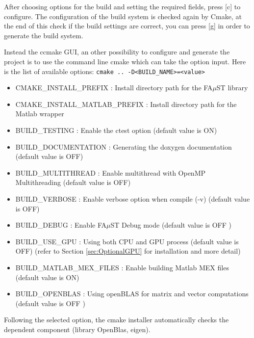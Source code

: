 After choosing options for the build and setting the required fields, press [c] to configure. The configuration of the build system is checked again by Cmake, at the end of this check if the build settings are correct, you can press [g] in order to generate the build system.

Instead the ccmake GUI, an other possibility to configure and generate the project is to use the command line cmake which can take the option input. Here is the list of available options: 
\texttt{cmake\ ..\ -D<BUILD\_NAME>=<value>}

\begin{itemize}
\item CMAKE\_INSTALL\_PREFIX : Install directory path for the FA$\mu$ST library
\item CMAKE\_INSTALL\_MATLAB\_PREFIX : Install directory path for the Matlab wrapper
\item BUILD\_TESTING : Enable the ctest option (default value is ON)
\item BUILD\_DOCUMENTATION : Generating the doxygen documentation (default value is OFF)  
\item BUILD\_MULTITHREAD : Enable multithread with OpenMP Multithreading (default value is OFF)
\item BUILD\_VERBOSE : Enable verbose option when compile (-v) (default value is OFF)
\item BUILD\_DEBUG : Enable FA$\mu$ST Debug mode (default value is OFF )
\item BUILD\_USE\_GPU : Using both CPU and GPU process (default value is OFF) (refer to Section \ref{sec:OptionalGPU} for installation and more detail)
\item BUILD\_MATLAB\_MEX\_FILES : Enable building Matlab MEX files (default value is ON)
\item BUILD\_OPENBLAS : Using openBLAS for matrix and vector computations (default value is OFF )
\end{itemize}

Following the selected option, the cmake installer automatically checks the dependent component (library OpenBlas, eigen).  


